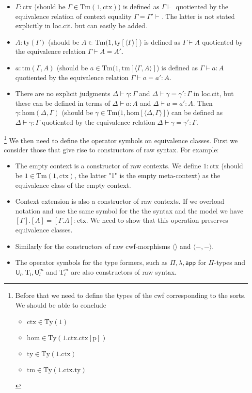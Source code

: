 \documentclass[11pt,a4paper]{article}
\theoremstyle{plain}
\theoremstyle{definition}
\newcommand{\app}[2]{{#1\,#2}} %
\newcommand{\Ty}{\mathrm{Ty}}
\newcommand{\Tm}{\mathrm{Tm}}
\def\sub{\mathrm{hom}}
\newcommand{\ctx}{\mathrm{ctx}}
\newcommand{\ty}{\mathrm{ty}}
\newcommand{\tm}{\mathrm{tm}}
\newcommand{\tuple}[1]{\langle #1 \rangle}
\def\p{\mathrm{p}}
\def\app{\mathsf{app}}
\def\U{\mathsf{U}}
\newcommand{\Ta}{\mathrm{T}}
\begin{document}
\begin{itemize}
\item $\Gamma : \ctx$ (should be $\Gamma \in \Tm(1,\ctx)$) is defined as $\Gamma \vdash$ quotiented by the equivalence relation of context equality $\Gamma = \Gamma' \vdash$. The latter is not stated explicitly in loc.cit. but can easily be added.
\item $A :\ty(\Gamma)$ (should be $A \in \Tm(1,\ty[\tuple{\Gamma}]$) is defined as $\Gamma \vdash A$ quotiented by the equivalence relation $\Gamma \vdash A = A'$.
\item $a : \tm(\Gamma,A)$ (should be $a \in \Tm(1,\tm[\tuple{\Gamma,A}]$) is defined as $\Gamma \vdash a : A$ quotiented by the equivalence relation $\Gamma \vdash a = a' : A$.
\item There are no explicit judgments $\Delta \vdash \gamma : \Gamma$ and $\Delta \vdash \gamma = \gamma' : \Gamma$  in loc.cit, but these can be defined in terms of $\Delta \vdash a : A$ and $\Delta \vdash a = a' : A$. Then $\gamma : \sub(\Delta,\Gamma)$ (should be
$\gamma \in \Tm(1,\sub[\tuple{\Delta,\Gamma}]$) can be defined as $\Delta \vdash \gamma : \Gamma$ quotiented by the equivalence relation $\Delta \vdash  \gamma = \gamma' : \Gamma$.
\end{itemize}
\footnote{Before that we need to define the types of the cwf corresponding to the sorts. We should be able to conclude
\begin{itemize}
\item $\ctx \in \Ty(1)$
\item $\sub \in \Ty(1.\ctx.\ctx[\p])$
\item $\ty \in \Ty(1.\ctx)$
\item $\tm \in \Ty(1.\ctx.\ty)$
\end{itemize}
}
We then need to define the operator symbols on equivalence classes. First we consider those that give rise to constructors of raw syntax. For example:
\begin{itemize}
\item The empty context is a constructor of raw contexts. We define $1 : \ctx$ (should be $1 \in \Tm(1,\ctx)$, the latter "1" is the empty meta-context) as the equivalence class of the empty context.
\item Context extension is also a constructor of raw contexts. If we overload notation and use the same symbol for the the syntax and the model we have $[\Gamma].[A] = [\Gamma.A]: \ctx$. We need to show that this operation preserves equivalence classes.
\item Similarly for the constructors of raw cwf-morphisms $\tuple{}$ and $\tuple{-,-}$.
\item The operator symbols for the type formers, such as $\Pi, \lambda, \app$ for $\Pi$-types and $\U_l, \Ta_l, \U^m_l$ and $\Ta^m_l$ are also constructors of raw syntax.
\end{itemize}
\end{document}
